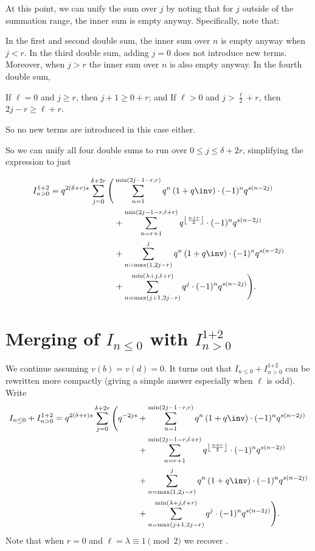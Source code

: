At this point, we can unify the sum over $j$ by noting that for $j$ outside of the
summation range, the inner sum is empty anyway.
Specifically, note that:
\begin{itemize}
  \ii In the first and second double sum,
  the inner sum over $n$ is empty anyway when $j < r$.
  \ii In the third double sum, adding $j=0$ does not introduce new terms.
  Moreover, when $j > r$ the inner sum over $n$ is also empty anyway.
  \ii In the fourth double sum,
  \begin{itemize}
    \ii If $\ell = 0$ and $j \ge r$, then $j+1 \ge 0+r$; and
    \ii If $\ell > 0$ and $j > \frac{\ell}{2} + r$, then $2j-r \ge \ell+r$.
  \end{itemize}
  So no new terms are introduced in this case either.
\end{itemize}
So we can unify all four double sums to run over $0 \le j \le \delta + 2r$,
simplifying the expression to just

\begin{align*}
  I_{n > 0}^{\text{1+2}}
  = q^{2(\delta+r)s}
  \sum_{j = 0}^{\delta + 2r} \Bigg(
    & \sum_{n=1}^{\min(2j-1-r, r)}
      q^{n} \left( 1 + q\inv \right) \cdot (-1)^n q^{s(n-2j)} \\
    & + \sum_{n=r+1}^{\min(2j-1-r, \ell+r)}
      q^{\left\lfloor \frac{n+r}{2} \right\rfloor} \cdot (-1)^n q^{s(n-2j)} \\
    &+ \sum_{n=\max(1,2j-r)}^{j}
      q^{n} \left( 1 + q\inv \right) \cdot (-1)^n q^{s(n-2j)} \\
    &+ \sum_{n=\max(j+1, 2j-r)}^{\min(\lambda+j, \ell+r)} q^{j} \cdot (-1)^n q^{s(n-2j)} \Bigg).
\end{align*}

\section{Merging of $I_{n \le 0}$ with $I_{n > 0}^{\text{1+2}}$}
We continue assuming $v(b) = v(d) = 0$.
It turns out that $I_{n \le 0} + I_{n > 0}^{\text{1+2}}$ can be rewritten more compactly
(giving a simple answer especially when $\ell$ is odd).
Write
\begin{align*}
  I_{n \le 0} + I_{n > 0}^{\text{1+2}}
  = q^{2(\delta+r)s}
  \sum_{j = 0}^{\delta + 2r} \Bigg(
    q^{-2js}
    &+ \sum_{n=1}^{\min(2j-1-r, r)}
      q^{n} \left( 1 + q\inv \right) \cdot (-1)^n q^{s(n-2j)} \\
    &+ \sum_{n=r+1}^{\min(2j-1-r, \ell+r)}
      q^{\left\lfloor \frac{n+r}{2} \right\rfloor} \cdot (-1)^n q^{s(n-2j)} \\
    &+ \sum_{n=\max(1,2j-r)}^{j}
      q^{n} \left( 1 + q\inv \right) \cdot (-1)^n q^{s(n-2j)} \\
    &+ \sum_{n=\max(j+1, 2j-r)}^{\min(\lambda+j, \ell+r)} q^{j} \cdot (-1)^n q^{s(n-2j)} \Bigg).
\end{align*}
Note that when $r=0$ and $\ell = \lambda \equiv 1 \pmod 2$
we recover \cite[equation (4.13)]{ref:AFL}.

